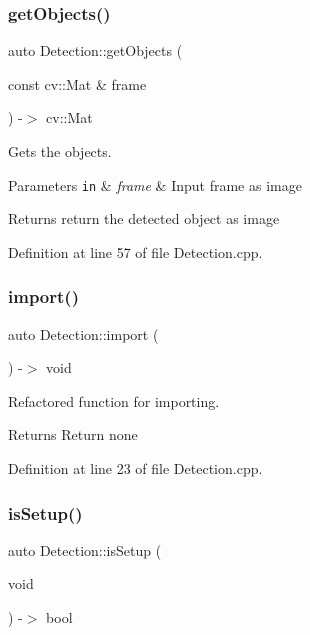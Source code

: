 \subsubsection{\texorpdfstring{get\+Objects()}{getObjects()}}
{\footnotesize\ttfamily auto Detection\+::get\+Objects (\begin{DoxyParamCaption}\item[{const cv\+::\+Mat \&}]{frame }\end{DoxyParamCaption}) -\/$>$ cv\+::\+Mat}



Gets the objects. 


\begin{DoxyParams}[1]{Parameters}
\mbox{\tt in}  & {\em frame} & Input frame as image\\
\hline
\end{DoxyParams}
\begin{DoxyReturn}{Returns}
return the detected object as image 
\end{DoxyReturn}


Definition at line 57 of file Detection.\+cpp.

\mbox{\label{class_detection_a0f4577baa1334c17054489a3ab8804ba}} 
\subsubsection{\texorpdfstring{import()}{import()}}
{\footnotesize\ttfamily auto Detection\+::import (\begin{DoxyParamCaption}{ }\end{DoxyParamCaption}) -\/$>$ void}



Refactored function for importing. 

\begin{DoxyReturn}{Returns}
Return none 
\end{DoxyReturn}


Definition at line 23 of file Detection.\+cpp.

\mbox{\label{class_detection_a3a657b6943cacfd4bdd55d90def58427}} 
\subsubsection{\texorpdfstring{is\+Setup()}{isSetup()}}
{\footnotesize\ttfamily auto Detection\+::is\+Setup (\begin{DoxyParamCaption}\item[{void}]{ }\end{DoxyParamCaption}) -\/$>$ bool\hspace{0.3cm}{\ttfamily [virtual]}}



